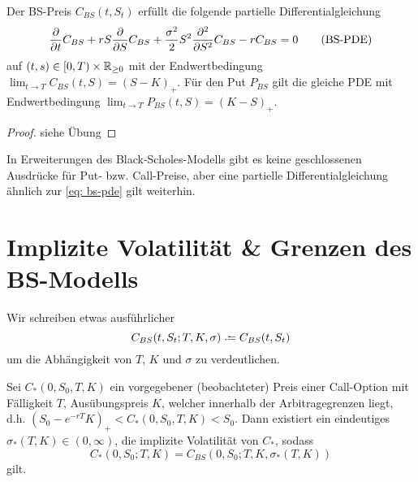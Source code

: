 \begin{korollar} %
	Der BS-Preis $C_{BS}(t,S_t)$ erfüllt die folgende partielle Differentialgleichung
	\begin{equation*}
		\frac{\partial}{\partial t } C_{BS} + r S \frac{\partial}{\partial S } C_{BS} + \frac{\sigma^2}{2} S^2 \frac{\partial^2}{\partial S^2} C_{BS} - r C_{BS} = 0
		\tag{BS-PDE} \label{eq: bs-pde}
	\end{equation*}
	auf $(t,s) \in [0,T) \times \mathbb{R}_{\ge 0}$ mit der Endwertbedingung $\lim_{t \to T} C_{BS}(t,S) = (S - K)_+$. Für den Put $P_{BS}$ gilt die gleiche PDE mit Endwertbedingung $\lim_{t \to T} P_{BS}(t,S) = (K-S)_+$.
\end{korollar}
\begin{proof}
	siehe Übung
\end{proof}

\begin{*bemerkung}
	In Erweiterungen des Black-Scholes-Modells gibt es keine geschlossenen Ausdrücke für Put- bzw. Call-Preise, aber eine partielle Differentialgleichung ähnlich zur \eqref{eq: bs-pde} gilt weiterhin.
\end{*bemerkung}

\section{Implizite Volatilität \& Grenzen des BS-Modells}

Wir schreiben etwas ausführlicher 
\begin{equation*}
	C_{BS}(t,S_t;T,K,\sigma) \defeq C_{BS}(t,S_t)
\end{equation*}
um die Abhängigkeit von $T$, $K$ und $\sigma$ zu verdeutlichen.

\begin{theorem} %
	Sei $C_\ast(0,S_0,T,K)$ ein vorgegebener (beobachteter) Preis einer Call-Option mit Fälligkeit $T$, Ausübungspreis $K$, welcher innerhalb der Arbitragegrenzen liegt, d.h. $(S_0 - e^{-rT} K)_+ < C_\ast(0,S_0,T,K) < S_0$. Dann existiert ein eindeutiges $\sigma_\ast(T,K) \in (0,\infty)$, die implizite Volatilität von $C_\ast$, sodass
	\begin{equation*}
		C_\ast(0,S_0;T,K) = C_{BS}(0,S_0;T,K,\sigma_\ast(T,K))
 	\end{equation*}
 	gilt.
\end{theorem}

